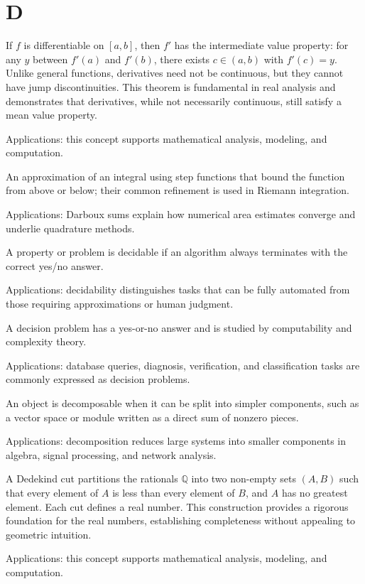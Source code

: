 \chapter*{D}
\label{chap:d}

If $f$ is differentiable on $[a,b]$, then $f'$ has the intermediate value property: for any $y$ between $f'(a)$ and $f'(b)$, there exists $c \in (a,b)$ with $f'(c) = y$. Unlike general functions, derivatives need not be continuous, but they cannot have jump discontinuities. This theorem is fundamental in real analysis and demonstrates that derivatives, while not necessarily continuous, still satisfy a mean value property. \par\noindent Applications: this concept supports mathematical analysis, modeling, and computation.

An approximation of an integral using step functions that bound the function from above or below; their common refinement is used in Riemann integration. \par\noindent Applications: Darboux sums explain how numerical area estimates converge and underlie quadrature methods.

A property or problem is decidable if an algorithm always terminates with the correct yes/no answer. \par\noindent Applications: decidability distinguishes tasks that can be fully automated from those requiring approximations or human judgment.

A decision problem has a yes-or-no answer and is studied by computability and complexity theory. \par\noindent Applications: database queries, diagnosis, verification, and classification tasks are commonly expressed as decision problems.

An object is decomposable when it can be split into simpler components, such as a vector space or module written as a direct sum of nonzero pieces. \par\noindent Applications: decomposition reduces large systems into smaller components in algebra, signal processing, and network analysis.

A Dedekind cut partitions the rationals $\mathbb{Q}$ into two non-empty sets $(A, B)$ such that every element of $A$ is less than every element of $B$, and $A$ has no greatest element. Each cut defines a real number. This construction provides a rigorous foundation for the real numbers, establishing completeness without appealing to geometric intuition. \par\noindent Applications: this concept supports mathematical analysis, modeling, and computation.

